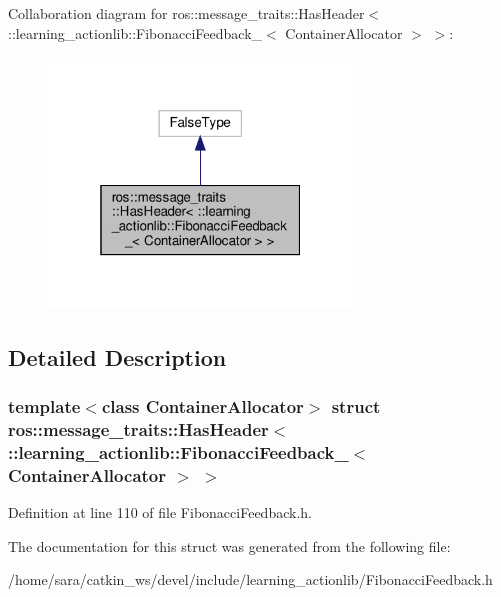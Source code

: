 Collaboration diagram for ros\+:\+:message\+\_\+traits\+:\+:Has\+Header$<$ \+:\+:learning\+\_\+actionlib\+:\+:Fibonacci\+Feedback\+\_\+$<$ Container\+Allocator $>$ $>$\+:
\nopagebreak
\begin{figure}[H]
\begin{center}
\leavevmode
\includegraphics[width=229pt]{structros_1_1message__traits_1_1HasHeader_3_01_1_1learning__actionlib_1_1FibonacciFeedback___3_02566c649e0ac9be00047ad1a110a5c19}
\end{center}
\end{figure}


\subsection{Detailed Description}
\subsubsection*{template$<$class Container\+Allocator$>$\newline
struct ros\+::message\+\_\+traits\+::\+Has\+Header$<$ \+::learning\+\_\+actionlib\+::\+Fibonacci\+Feedback\+\_\+$<$ Container\+Allocator $>$ $>$}



Definition at line 110 of file Fibonacci\+Feedback.\+h.



The documentation for this struct was generated from the following file\+:\begin{DoxyCompactItemize}
\item 
/home/sara/catkin\+\_\+ws/devel/include/learning\+\_\+actionlib/Fibonacci\+Feedback.\+h\end{DoxyCompactItemize}
